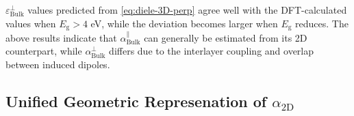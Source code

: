 $\varepsilon_{\mathrm{Bulk}}^{\perp}$ values predicted from
 \autoref{eq:diele-3D-perp} agree well with the DFT-calculated values when
$E_{\mathrm{g}}>4$ eV, while the deviation becomes larger when
$E_{\mathrm{g}}$ reduces. The above results indicate that
$\alpha^{\parallel}_{\mathrm{Bulk}}$ can generally be estimated from
its 2D counterpart, while $\alpha^{\perp}_{\mathrm{Bulk}}$ differs due
to the interlayer coupling and overlap between induced
dipoles\cite{Andersen_2015_dielec_vdWH,Laturia_2018_2D_eps}. 

\subsection{Unified Geometric Represenation of $\alpha_{\mathrm{2D}}$}
\label{sec:diel-unif-geom-repr}

